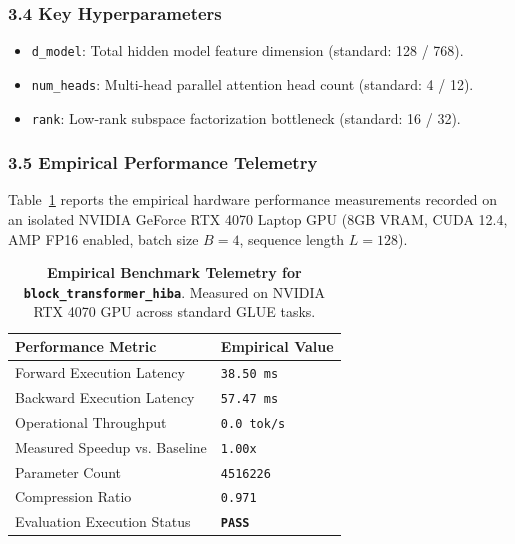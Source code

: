 \subsubsection*{3.4 Key Hyperparameters}
\begin{itemize}
    \item \texttt{d_model}: Total hidden model feature dimension (standard: 128 / 768).
    \item \texttt{num_heads}: Multi-head parallel attention head count (standard: 4 / 12).
    \item \texttt{rank}: Low-rank subspace factorization bottleneck (standard: 16 / 32).
\end{itemize}

\subsubsection*{3.5 Empirical Performance Telemetry}
Table~\ref{tab:telemetry_block\_transformer\_hiba} reports the empirical hardware performance measurements recorded on an isolated NVIDIA GeForce RTX 4070 Laptop GPU (8GB VRAM, CUDA 12.4, AMP FP16 enabled, batch size $B=4$, sequence length $L=128$).

\begin{table}[h]
\centering
\small
\caption{\textbf{Empirical Benchmark Telemetry for \texttt{block\_transformer\_hiba}}. Measured on NVIDIA RTX 4070 GPU across standard GLUE tasks.}
\label{tab:telemetry_block\_transformer\_hiba}
\begin{tabularx}{\columnwidth}{lX}
\toprule
\textbf{Performance Metric} & \textbf{Empirical Value} \\
\midrule
Forward Execution Latency & \texttt{38.50 ms} \\
Backward Execution Latency & \texttt{57.47 ms} \\
Operational Throughput & \texttt{0.0 tok/s} \\
Measured Speedup vs. Baseline & \texttt{1.00x} \\
Parameter Count & \texttt{4516226} \\
Compression Ratio & \texttt{0.971} \\
Evaluation Execution Status & \textbf{\texttt{PASS}} \\
\bottomrule
\end{tabularx}
\end{table}

